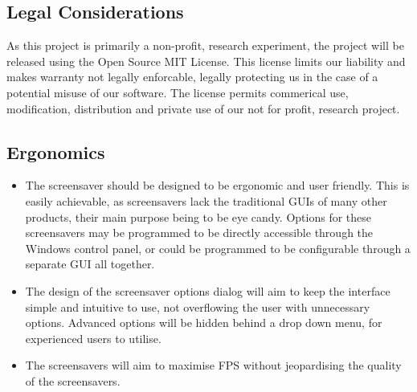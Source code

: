 \documentclass[10pt, openany]{book}
\begin{document}
\subsection{Legal Considerations}
As this project is primarily a non-profit, research experiment, the project will be released using the Open Source MIT License. This license limits our liability and makes warranty not legally enforcable, legally protecting us in the case of a potential misuse of our software. The license permits commerical use, modification, distribution and private use of our not for profit, research project.

\subsection{Ergonomics}
\begin{itemize}
	\item The screensaver should be designed to be ergonomic and user friendly. This is easily achievable, as screensavers lack the traditional GUIs of many other products, their main purpose being to be eye candy. Options for these screensavers may be programmed to be directly accessible through the Windows control panel, or could be programmed to be configurable through a separate GUI all together.
	\item The design of the screensaver options dialog will aim to keep the interface simple and intuitive to use, not overflowing the user with unnecessary options. Advanced options will be hidden behind a drop down menu, for experienced users to utilise.
	\item The screensavers will aim to maximise FPS without jeopardising the quality of the screensavers.	
\end{itemize}	
\end{document}
